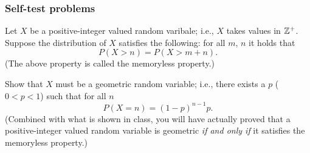\subsubsection{Self-test problems}
\begin{problem}
  Let \(X\) be a positive-integer valued random varibale; i.e., \(X\) takes
  values in \(\mathbb{Z}^+\). Suppose the distribution of \(X\) satisfies the
  following: for all \(m\), \(n\) it holds that
  \[
    P(X>n)=P(X>m+n).
  \]
  (The above property is called the memoryless property.)

  Show that \(X\) must be a geometric random variable; i.e., there exists a
  \(p\) (\(0<p<1\)) such that for all \(n\)
  \[
    P(X=n)=(1-p)^{n-1}p.
  \]
  (Combined with what is shown in class, you will have actually proved that
  a positive-integer valued random variable is geometric \emph{if and only
    if} it satisfies the memoryless property.)
\end{problem}
\begin{solution*}
\end{solution*}

